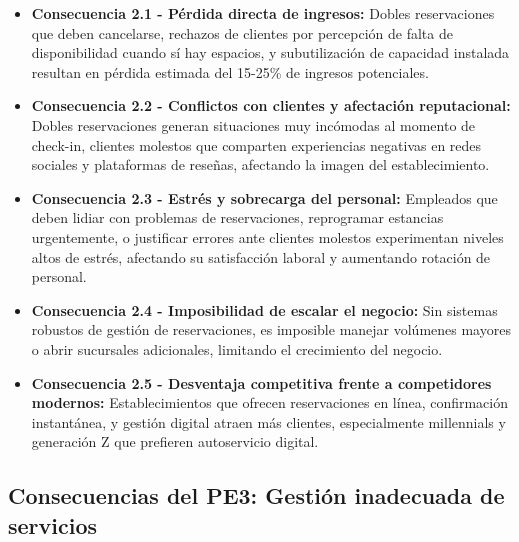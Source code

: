 	\begin{itemize}
		\item \textbf{Consecuencia 2.1 - Pérdida directa de ingresos:} Dobles reservaciones que deben cancelarse, rechazos de clientes por percepción de falta de disponibilidad cuando sí hay espacios, y subutilización de capacidad instalada resultan en pérdida estimada del 15-25\% de ingresos potenciales.
		
		\item \textbf{Consecuencia 2.2 - Conflictos con clientes y afectación reputacional:} Dobles reservaciones generan situaciones muy incómodas al momento de check-in, clientes molestos que comparten experiencias negativas en redes sociales y plataformas de reseñas, afectando la imagen del establecimiento.
		
		\item \textbf{Consecuencia 2.3 - Estrés y sobrecarga del personal:} Empleados que deben lidiar con problemas de reservaciones, reprogramar estancias urgentemente, o justificar errores ante clientes molestos experimentan niveles altos de estrés, afectando su satisfacción laboral y aumentando rotación de personal.
		
		\item \textbf{Consecuencia 2.4 - Imposibilidad de escalar el negocio:} Sin sistemas robustos de gestión de reservaciones, es imposible manejar volúmenes mayores o abrir sucursales adicionales, limitando el crecimiento del negocio.
		
		\item \textbf{Consecuencia 2.5 - Desventaja competitiva frente a competidores modernos:} Establecimientos que ofrecen reservaciones en línea, confirmación instantánea, y gestión digital atraen más clientes, especialmente millennials y generación Z que prefieren autoservicio digital.
	\end{itemize}

\subsection{Consecuencias del PE3: Gestión inadecuada de servicios}
\label{sec:consecuencias3}


